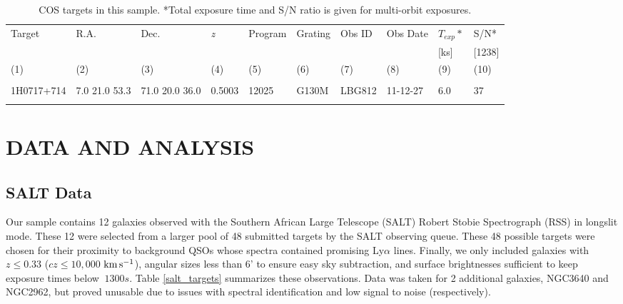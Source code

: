 \documentclass[iop]{emulateapj-rtx4}
\newcommand{\kms}{$\rm km\, s^{-1}$}
\begin{document}
\begin{table}[ht]\footnotesize
\begin{center}
\begin{tabular}{l l l l l l l l l l}
 \hline \hline
  Target 		& R.A. 		& Dec. 		& \textit{z}		 & Program 	  & Grating 	  & Obs ID 	    & Obs Date 	    & $T_{exp}*$     & S/N*  \\ 
  	    		& 	       		&	  		& 		  	 & 		    	  & 		  	  & 		  	   & 		     	    & 	        [ks]        & [1238] \\ 
 \scriptsize (1)  & \scriptsize (2) & \scriptsize (3) & \scriptsize (4) & \scriptsize (5) & \scriptsize (6) & \scriptsize  (7) & \scriptsize (8) & \scriptsize (9) & \scriptsize (10)  \\ \hline \hline
\\
    
1H0717+714		  &  7.0  21.0   53.3  &     71.0  20.0  36.0  &    0.5003  & 12025  	    &   G130M  &   LBG812  		 & 11-12-27      	 	  &  6.0    &      37         \\



 \\
\hline

\end{tabular}
\end{center}
  \caption{\small{COS targets in this sample. *Total exposure time and S/N ratio is given for multi-orbit exposures.}}
  \label{target_table}
\end{table}


\section{DATA AND ANALYSIS}

\subsection{SALT Data}
Our sample contains 12 galaxies observed with the Southern African Large Telescope (SALT) Robert Stobie Spectrograph (RSS) in longslit mode. These 12 were selected from a larger pool of 48 submitted targets by the SALT observing queue. These 48 possible targets were chosen for their proximity to background QSOs whose spectra contained promising Ly$\alpha$ lines. Finally, we only included galaxies with $z \leq 0.33$ ($cz \leq 10,000$ \kms), angular sizes less than 6' to ensure easy sky subtraction, and surface brightnesses sufficient to keep exposure times below $~1300 s$. Table \ref{salt_targets} summarizes these observations. Data was taken for 2 additional galaxies, NGC3640 and NGC2962, but proved unusable due to issues with spectral identification and low signal to noise (respectively).
\end{document}
